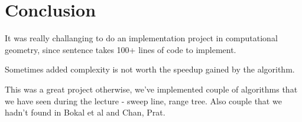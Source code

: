 \documentclass{article}
\begin{document}
\section{Conclusion}
It was really challanging to do an implementation project in computational geometry, since sentence takes 100+ lines of code to implement.

Sometimes added complexity is not worth the speedup gained by the algorithm.

This was a great project otherwise, we've implemented couple of algorithms that we have seen during the lecture - sweep line, range tree. Also couple that we hadn't found in Bokal et al and Chan, Prat.



\end{document}
